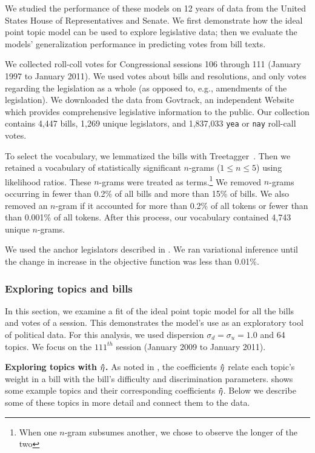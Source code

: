 We studied the performance of these models on 12 years of data from
the United States House of Representatives and Senate.  We first
demonstrate how the ideal point topic model can be used to explore
legislative data; then we evaluate the models' generalization
performance in predicting votes from bill texts.

We collected roll-coll votes for Congressional sessions 106 through
111 (January 1997 to January 2011).  We used votes about bills and
resolutions, and only votes regarding the legislation as a whole
(as opposed to, e.g., amendments of the legislation). We downloaded
the data from Govtrack, an independent Website which provides
comprehensive legislative information to the public.  Our
collection contains 4,447 bills, 1,269 unique legislators, and
1,837,033 \verb!yea! or \verb!nay! roll-call votes.

To select the vocabulary, we lemmatized the bills with
Treetagger~\cite{treetagger}.  Then we retained a vocabulary of
statistically significant $n$-grams ($1 \le n \le 5$) using likelihood
ratios.  These $n$-grams were treated as terms.\footnote{When one
  $n$-gram subsumes another, we chose to observe the longer of the
  two}  We removed $n$-grams occurring in fewer than 0.2\% of all
bills and more than 15\% of bills.  We also removed an
$n$-gram if it accounted for more than 0.2\% of all tokens or fewer
than than 0.001\% of all tokens.  After this process, our vocabulary
contained 4,743 unique $n$-grams.

We used the anchor legislators described in .  We ran
variational inference until the change in increase in the objective
function was less than 0.01\%.

\subsubsection*{Exploring topics and bills}

In this section, we examine a fit of the ideal point topic model for
all the bills and votes of a session.  This demonstrates the model's
use as an exploratory tool of political data.  For this analysis, we
used dispersion $\sigma_d = \sigma_u = 1.0$ and 64 topics.  We focus
on the $111^{th}$ session (January 2009 to January 2011).

\textbf{Exploring topics with $\bm \hat \eta$.} As noted in , the
coefficients $\bm \hat \eta$ relate each topic's weight in a bill with the
bill's difficulty and discrimination parameters.  shows
some example topics and their corresponding coefficients $\bm \hat \eta$.  Below
we describe some of these topics in more detail and connect them to
the data.

